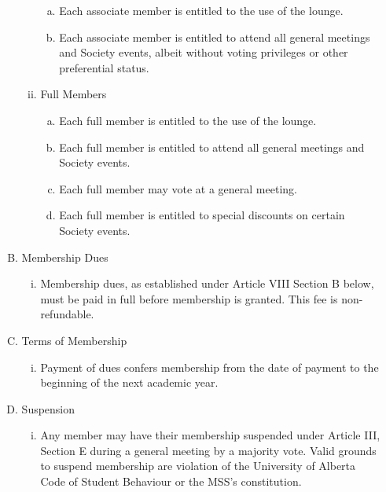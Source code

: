 \documentclass[11pt]{article}
\begin{document}
\begin{enumerate}[I.]
\begin{enumerate}[A)]
\begin{enumerate}[i)]
            \begin{enumerate}[a)]
              \item Each associate member is entitled to the use of the lounge. 
              \item Each associate member is entitled to attend all general
                meetings and Society events, albeit without voting privileges
                or other preferential status. 
            \end{enumerate}
          \item Full Members
            \begin{enumerate}[a)]
              \item Each full member is entitled to the use of the lounge. 
              \item Each full member is entitled to attend all general meetings
                and Society events. 
              \item Each full member may vote at a general meeting. 
              \item Each full member is entitled to special discounts on
                certain Society events. 
            \end{enumerate}
        \end{enumerate}
      \item Membership Dues
        \begin{enumerate}[i)]
          \item Membership dues, as established under Article VIII Section B
            below, must be paid in full before membership is granted. This fee
            is non-refundable. 
        \end{enumerate}
      \item Terms of Membership
        \begin{enumerate}[i)]
          \item Payment of dues confers membership from the date of payment to
            the beginning of the next academic year.
        \end{enumerate}
      \item Suspension
        \begin{enumerate}[i)]
          \item Any member may have their membership suspended under Article
            III, Section E during a general meeting by a majority vote. Valid
            grounds to suspend membership are violation of the University of
            Alberta Code of Student Behaviour or the MSS's constitution.

\end{enumerate}
\end{enumerate}
\end{enumerate}
\end{document}
